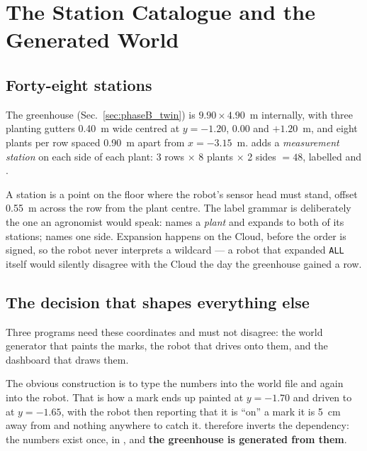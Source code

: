 \section{The Station Catalogue and the Generated World}
\label{sec:phaseC_catalogue}

\subsection{Forty-eight stations}

The \phaseB{} greenhouse (Sec.~\ref{sec:phaseB_twin}) is
$9.90 \times 4.90$~m internally, with three planting gutters 0.40~m wide
centred at $y = -1.20$, $0.00$ and $+1.20$~m, and eight plants per row
spaced 0.90~m apart from $x = -3.15$~m. \phaseC{} adds a
\emph{measurement station} on each side of each plant: 3 rows
$\times$ 8 plants $\times$ 2 sides $= 48$, labelled  and
.

A station is a point on the floor where the robot's sensor head must
stand, offset \SI{0.55}{m} across the row from the plant centre. The
label grammar is deliberately the one an agronomist would speak:
 names a \emph{plant} and expands to both of its stations;
 names one side. Expansion happens on the Cloud, before
the order is signed, so the robot never interprets a wildcard --- a
robot that expanded \texttt{ALL} itself would silently disagree with the
Cloud the day the greenhouse gained a row.

\subsection{The decision that shapes everything else}

Three programs need these coordinates and must not disagree: the world
generator that paints the marks, the robot that drives onto them, and
the dashboard that draws them.

The obvious construction is to type the numbers into the world file and
again into the robot. That is how a mark ends up painted at $y=-1.70$
and driven to at $y=-1.65$, with the robot then reporting that it is
``on'' a mark it is 5~cm away from and nothing anywhere to catch it.
\phaseC{} therefore inverts the dependency: the numbers exist once, in
, and \textbf{the greenhouse is generated
from them}.

